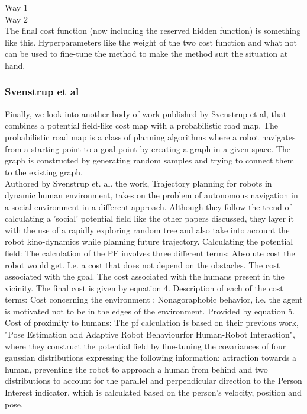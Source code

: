 Way 1\\
Way 2\\

The final cost function (now including the reserved hidden function) is something like this.
Hyperparameters like the weight of the two cost function and what not can be used to fine-tune the method to make the method suit the situation at hand.

\subsubsection*{Svenstrup et al}
Finally, we look into another body of work published by Svenstrup et al, that combines a potential field-like cost map with a probabilistic road map. The probabilistic road map is a class of planning algorithms where a robot navigates from a starting point to a goal point by creating a graph in a given space. The graph is constructed by generating random samples and trying to connect them to the existing graph.\\
Authored by Svenstrup et. al. the work, Trajectory planning for robots in dynamic human environment, takes on the problem of autonomous navigation in a social environment in a different approach. Although they follow the trend of calculating a 'social' potential field like the other papers discussed, they layer it with the use of a rapidly exploring random tree and also take into account the robot kino-dynamics while planning future trajectory.
Calculating the potential field:
The calculation of the PF involves three different terms:
Absolute cost the robot would get. I.e. a cost that does not depend on the obstacles.	
The cost associated with the goal.
The cost associated with the humans present in the vicinity.
The final cost is given by equation 4.
Description of each of the cost terms:
Cost concerning the environment :
Nonagoraphobic behavior,  i.e. the agent is motivated not to be in the edges of the environment. Provided by equation 5.
Cost of proximity to humans:
The pf calculation is based on their previous work, "Pose Estimation and Adaptive Robot Behaviourfor Human-Robot Interaction", where they construct the potential field by fine-tuning the covariances of four gaussian distributions expressing the following information: attraction towards a human, preventing the robot to approach a human from behind and two distributions to account for the parallel and perpendicular direction to the Person Interest indicator, which is calculated based on the person's velocity, position and pose.  

